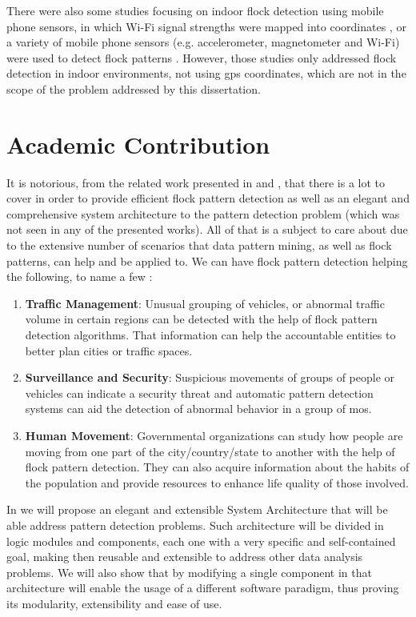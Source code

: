 There were also some studies focusing on indoor flock detection using mobile phone sensors, in which Wi-Fi signal
strengths were mapped into coordinates \citep{mobile1}, or a variety of mobile phone sensors (e.g. accelerometer,
magnetometer and Wi-Fi) were used to detect flock patterns \citep{mobile2}. However, those studies only addressed flock
detection in indoor environments, not using \ac{gps} coordinates, which are not in the scope of the problem addressed by
this dissertation.

\section{Academic Contribution}
It is notorious, from the related work presented in  and , that there is
a lot to cover in order to provide efficient flock pattern detection as well as an elegant and comprehensive system
architecture to the pattern detection problem (which was not seen in any of the presented works). All of that is a
subject to care about due to the extensive number of scenarios that data pattern mining, as well as flock patterns, can
help and be applied to. We can have flock pattern detection helping the following, to name a few \citep{applications}:

\begin{enumerate}
    \item \textbf{Traffic Management}: Unusual grouping of vehicles, or abnormal traffic volume in certain regions can
        be detected with the help of flock pattern detection algorithms. That information can help the accountable
        entities to better plan cities or traffic spaces.
    \item \textbf{Surveillance and Security}: Suspicious movements of groups of people or vehicles can indicate a
        security threat and automatic pattern detection systems can aid the detection of abnormal behavior in a group of
        \acp{mo}.
    \item \textbf{Human Movement}: Governmental organizations can study how people are moving from one part of the
        city/country/state to another with the help of flock pattern detection. They can also acquire information about
        the habits of the population and provide resources to enhance life quality of those involved.
\end{enumerate}

In  we will propose an elegant and extensible System Architecture that will be able address
pattern detection problems. Such architecture will be divided in logic modules and components, each one with a very
specific and self-contained goal, making then reusable and extensible to address other data analysis problems. We will
also show that by modifying a single component in that architecture will enable the usage of a different software
paradigm, thus proving its modularity, extensibility and ease of use.

